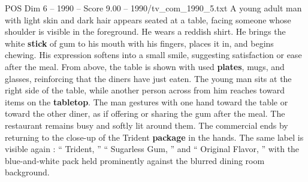 \begin{textsample}{POS Dim 6 – 1990 – Score 9.00 – 1990/tv\_com\_1990\_5.txt}
A young adult man with light skin and dark hair appears seated at a table, facing someone whose shoulder is visible in the foreground.
He wears a reddish shirt.
He brings the white \textbf{stick} of gum to his mouth with his fingers, places it in, and begins chewing.
His expression softens into a small smile, suggesting satisfaction or ease after the meal.
From above, the table is shown with used \textbf{plates}, mugs, and glasses, reinforcing that the diners have just eaten.
The young man sits at the right side of the table, while another person across from him reaches toward items on the \textbf{tabletop}.
The man gestures with one hand toward the table or toward the other diner, as if offering or sharing the gum after the meal.
The restaurant remains busy and softly lit around them.
The commercial ends by returning to the close-up of the Trident \textbf{package} in the hands.
The same label is visible again : “ Trident, ” “ Sugarless Gum, ” and “ Original Flavor, ” with the blue-and-white pack held prominently against the blurred dining room background.

\end{textsample}
